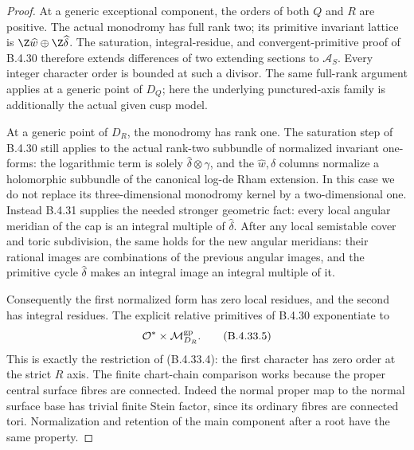 \begin{proof}
At a generic exceptional component, the
orders of both $Q$ and $R$ are positive.
The actual monodromy has full rank two;
its primitive invariant lattice is
$\Z\widehat w\oplus\Z\widehat\delta$.
The saturation, integral-residue, and
convergent-primitive proof of B.4.30
therefore extends differences of two
extending sections to $\mathcal A_S$.
Every integer character order is bounded
at such a divisor. The same full-rank
argument applies at a generic point of
$D_Q$; here the underlying punctured-axis
family is additionally the actual given
cusp model.

At a generic point of $D_R$, the monodromy
has rank one. The saturation step of
B.4.30 still applies to the actual
rank-two subbundle of normalized invariant
one-forms:
the logarithmic term is solely
$\widehat\delta\otimes\gamma$, and the
$\widehat w,\widehat\delta$ columns
normalize a holomorphic subbundle of the
canonical log-de Rham extension. In this
case we do not replace its three-dimensional
monodromy kernel by a two-dimensional one.
Instead B.4.31 supplies the needed stronger
geometric fact: every local angular
meridian of the cap is an integral multiple
of $\widehat\delta$. After any local
semistable cover and toric subdivision,
the same holds for the new angular
meridians: their rational images are
combinations of the previous angular
images, and the primitive cycle
$\widehat\delta$ makes an integral image
an integral multiple of it.

Consequently the first normalized form
has zero local residues, and the second
has integral residues. The explicit
relative primitives of B.4.30 exponentiate
to
\[
             \mathcal O^*\times
                    \mathcal M_{D_R}^{\rm gp}.
 \tag{B.4.33.5}
\]
This is exactly the restriction of
(B.4.33.4): the first character has zero
order at the strict $R$ axis. The finite
chart-chain comparison works because the
proper central surface fibres are
connected. Indeed the normal proper map
to the normal surface base has trivial
finite Stein factor, since its ordinary
fibres are connected tori. Normalization
and retention of the main component after
a root have the same property.


\end{proof}
